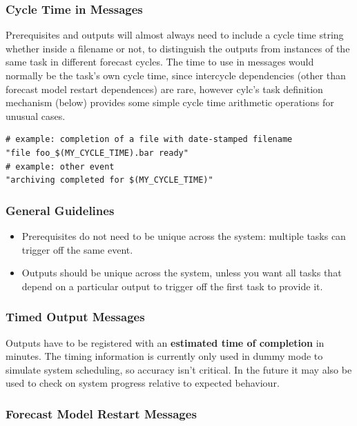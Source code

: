 \documentclass[11pt,a4paper]{article}
\begin{document}
\subsubsection{Cycle Time in Messages}

Prerequisites and outputs will almost always need to include a cycle
time string whether inside a
filename or not, to distinguish the outputs from instances of the same
task in different forecast cycles. The time to use in messages would
normally be the task's own cycle time, since intercycle dependencies
(other than forecast model restart dependences) are rare, however cylc's
task definition mechanism (below) provides some simple cycle time
arithmetic operations for unusual cases. 

\lstset{language=Python}
\begin{lstlisting}
# example: completion of a file with date-stamped filename
"file foo_$(MY_CYCLE_TIME).bar ready"
# example: other event
"archiving completed for $(MY_CYCLE_TIME)"
\end{lstlisting}


\subsubsection{General Guidelines}

\begin{itemize}

    \item Prerequisites do not need to be unique across the system:
        multiple tasks can trigger off the same event.

    \item Outputs should be unique across the system, unless you want
        all tasks that depend on a particular output to trigger off the
        first task to provide it.

\end{itemize}

\subsubsection{Timed Output Messages}

Outputs have to be registered with an {\bf estimated time of completion}
in minutes. The timing information is currently only used in dummy mode
to simulate system scheduling, so accuracy isn't critical. In the future
it may also be used to check on system progress relative to expected
behaviour.


\subsubsection{Forecast Model Restart Messages}
\end{document}
